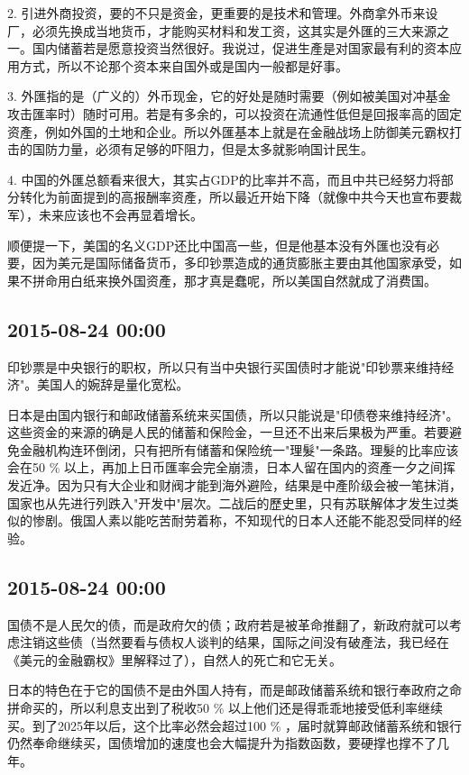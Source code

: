 \documentclass[twocolumn]{ctexart}
\begin{document}
2. 引进外商投资，要的不只是资金，更重要的是技术和管理。外商拿外币来设厂，必须先换成当地货币，才能购买材料和发工资，这其实是外匯的三大来源之一。国内储蓄若是愿意投资当然很好。我说过，促进生產是对国家最有利的资本应用方式，所以不论那个资本来自国外或是国内一般都是好事。

3. 外匯指的是（广义的）外币现金，它的好处是随时需要（例如被美国对冲基金攻击匯率时）随时可用。若是有多余的，可以投资在流通性低但是回报率高的固定资產，例如外国的土地和企业。所以外匯基本上就是在金融战场上防御美元霸权打击的国防力量，必须有足够的吓阻力，但是太多就影响国计民生。

4. 中国的外匯总额看来很大，其实占GDP的比率并不高，而且中共已经努力将部分转化为前面提到的高报酬率资產，所以最近开始下降（就像中共今天也宣布要裁军），未来应该也不会再显着增长。

顺便提一下，美国的名义GDP还比中国高一些，但是他基本没有外匯也没有必要，因为美元是国际储备货币，多印钞票造成的通货膨胀主要由其他国家承受，如果不拼命用白纸来换外国资產，那才真是蠢呢，所以美国自然就成了消费国。\subsection*{2015-08-24 00:00}
印钞票是中央银行的职权，所以只有当中央银行买国债时才能说"印钞票来维持经济"。美国人的婉辞是量化宽松。

日本是由国内银行和邮政储蓄系统来买国债，所以只能说是"印债卷来维持经济"。这些资金的来源的确是人民的储蓄和保险金，一旦还不出来后果极为严重。若要避免金融机构连环倒闭，只有把所有储蓄和保险统一"理髮"一条路。理髮的比率应该会在50 \% 以上，再加上日币匯率会完全崩溃，日本人留在国内的资產一夕之间挥发近净。因为只有大企业和财阀才能到海外避险，结果是中產阶级会被一笔抹消，国家也从先进行列跌入"开发中"层次。二战后的歷史里，只有苏联解体才发生过类似的惨剧。俄国人素以能吃苦耐劳着称，不知现代的日本人还能不能忍受同样的经验。\subsection*{2015-08-24 00:00}
国债不是人民欠的债，而是政府欠的债；政府若是被革命推翻了，新政府就可以考虑注销这些债（当然要看与债权人谈判的结果，国际之间没有破產法，我已经在《美元的金融霸权》里解释过了），自然人的死亡和它无关。

日本的特色在于它的国债不是由外国人持有，而是邮政储蓄系统和银行奉政府之命拼命买的，所以利息支出到了税收50 \% 以上他们还是得乖乖地接受低利率继续买。到了2025年以后，这个比率必然会超过100 \% ，届时就算邮政储蓄系统和银行仍然奉命继续买，国债增加的速度也会大幅提升为指数函数，要硬撑也撑不了几年。
\end{document}
